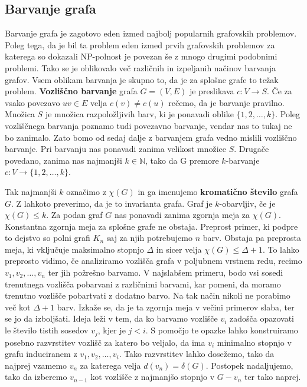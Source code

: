\documentclass[12pt,a4paper,twoside]{article}
\theoremstyle{definition} %
\theoremstyle{plain} %
\numberwithin{equation}{section}  %
\begin{document}
\subsection{Barvanje grafa}
Barvanje grafa je zagotovo eden izmed najbolj popularnih grafovskih problemov. Poleg tega, da je bil ta problem eden izmed prvih grafovskih problemov za katerega so dokazali NP-polnost je povezan še z mnogo drugimi podobnimi problemi. Tako se je oblikovalo več različnih in izpeljanih načinov barvanja grafov. Vsem oblikam barvanja je skupno to, da je za splošne grafe to težak problem.
\textbf{Vozliščno barvanje} grafa $G=(V, E)$ je preslikava $ c: V \rightarrow S$. Če za vsako povezavo $uv \in E$ velja $c(v) \neq c(u)$ rečemo, da je barvanje pravilno. Množica $S$ je množica razpoložljivih barv, ki je ponavadi oblike $ \{1,2,\ldots, k\}$. Poleg vozliščnega barvanja poznamo tudi povezavno barvanje, vendar nas to tukaj ne bo zanimalo. Zato bomo od sedaj dalje z barvanjem grafa vedno mislili vozliščno barvanje. Pri barvanju nas ponavadi zanima velikost množice $S$. Drugače povedano, zanima nas najmanjši $k \in \mathbb{N}$, tako da G premore $k$-barvanje $c : V \rightarrow \{1,2,\ldots, k\}$. 

Tak najmanjši $k$ označimo z $\chi(G)$ in ga imenujemo \textbf{kromatično število} grafa $G$. Z lahkoto preverimo, da je to invarianta grafa. Graf je $k$-obarvljiv, če je $ \chi(G) \le k$. Za podan graf $G$ nas ponavadi zanima zgornja meja za  $\chi(G)$. Konstantna zgornja meja za splošne grafe ne obstaja. Preprost primer, ki podpre to dejstvo so polni grafi $K_n$ saj za njih potrebujemo $n$ barv. Obstaja pa preprosta meja, ki vključuje maksimalno stopnjo $\Delta$ in sicer velja  $\chi(G) \le \Delta + 1$. To lahko preprosto vidimo, če analiziramo vozlišča grafa v poljubnem vrstnem redu, recimo $v_1, v_2, \dots, v_n$ ter jih požrešno barvamo. V najslabšem primeru, bodo vsi sosedi trenutnega vozlišča pobarvani z različnimi barvami, kar pomeni, da moramo trenutno vozlišče pobartvati z dodatno barvo. Na tak način nikoli ne porabimo več kot $\Delta + 1$ barv. Izkaže se, da je ta zgornja meja v večini primerov slaba, ter se jo da izboljšati. Ideja leži v tem, da ko barvamo vozlišče $v_i$ zadošča opazovati le število tistih sosedov $v_j$, kjer je $j < i$. S pomočjo te opazke lahko konstruiramo posebno razvrstitev vozlišč za katero bo veljalo, da ima $v_i$ minimalno stopnjo v grafu induciranem z $v_1, v_2, \ldots, v_i$. Tako razvrstitev lahko dosežemo, tako da najprej vzamemo $v_n$ za katerega velja $d(v_n) = \delta(G)$. Postopek nadaljujemo, tako da izberemo $v_{n-1}$ kot vozlišče z najmanjšo stopnjo v $G - v_n$ ter tako naprej.
\end{document}
